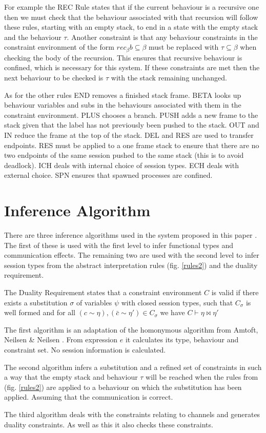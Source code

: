 For example the REC Rule states that if the current behaviour is a recursive one then we must check that the behaviour associated with that recursion will follow these rules, starting with an empty stack, to end in a state with the empty stack and the behaviour $\tau$. Another constraint is that any behaviour constraints in the constraint environment of the form $rec_{\beta}b \subseteq \beta$ must be replaced with $\tau \subseteq \beta$ when checking the body of the recursion. This ensures that recursive behaviour is confined, which is necessary for this system. If these constraints are met then the next behaviour to be checked is $\tau$ with the stack remaining unchanged.  

As for the other rules END removes a finished stack frame. BETA looks up behaviour variables and subs in the behaviours associated with them in the constraint environment. PLUS chooses a branch. PUSH adds a new frame to the stack given that the label has not previously been pushed to the stack. OUT and IN reduce the frame at the top of the stack. DEL and RES are used to transfer endpoints. RES must be applied to a one frame stack to ensure that there are no two endpoints of the same session pushed to the same stack (this is to avoid deadlock). ICH deals with internal choice of session types. ECH deals with external choice. SPN ensures that spawned processes are confined. 

\section{Inference Algorithm}

There are three inference algorithms used in the system proposed in this paper \cite{paper1}. The first of these is used with the first level to infer functional types and communication effects. The remaining two are used with the second level to infer session types from the abstract interpretation rules (fig. \ref{rules2}) and the duality requirement. 

The Duality Requirement states that a constraint environment $C$ is valid if there exists a substitution $\sigma$ of variables $\psi$ with closed session types, such that $C_\sigma$ is well formed and for all $(c\sim \eta), (\bar{c} \sim \eta') \in C_\sigma$ we have $C \vdash \eta \bowtie \eta'$

The first algorithm is an adaptation of the homonymous algorithm from Amtoft, Neilsen \& Neilsen \cite{amtoft}. From expression $e$ it calculates its type, behaviour and constraint set. No session information is calculated. 

The second algorithm infers a substitution and a refined set of constraints in such a way that the empty stack and behaviour $\tau$ will be reached when the rules from (fig. \ref{rules2}) are applied to a behaviour on which the substitution has been applied. Assuming that the communication is correct. 

The third algorithm deals with the constraints relating to channels and generates duality constraints. As well as this it also checks these constraints. 